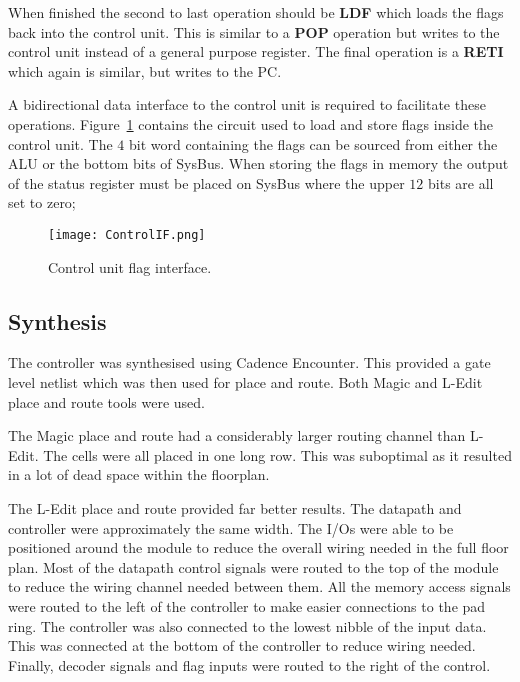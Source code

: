 When finished the second to last operation should be \textbf{LDF} which loads the flags back into the control unit.
This is similar to a \textbf{POP} operation but writes to the control unit instead of a general purpose register. 
The final operation is a \textbf{RETI} which again is similar, but writes to the PC.

A bidirectional data interface to the control unit is required to facilitate these operations. 
Figure~\ref{fig:FlagCircuit} contains the circuit used to load and store flags inside the control unit.
The $4$ bit word containing the flags can be sourced from either the ALU or the bottom bits of SysBus. 
When storing the flags in memory the output of the status register must be placed on SysBus where the upper $12$ bits are all set to zero;  

\begin{figure}[ht]
   \centering
    \texttt{[image: ControlIF.png]}
		\caption{Control unit flag interface.}
		\label{fig:FlagCircuit}
\end{figure}





\subsection{Synthesis}

The controller was synthesised using Cadence Encounter. 
This provided a gate level netlist which was then used for place and route.
Both Magic and L-Edit place and route tools were used. 

The Magic place and route had a considerably larger routing channel than L-Edit.
The cells were all placed in one long row. 
This was suboptimal as it resulted in a lot of dead space within the floorplan.

The L-Edit place and route provided far better results. 
The datapath and controller were approximately the same width. 
The I/Os were able to be positioned around the module to reduce the overall wiring needed in the full floor plan. 
Most of the datapath control signals were routed to the top of the module to reduce the wiring channel needed between them.
All the memory access signals were routed to the left of the controller to make easier connections to the pad ring. 
The controller was also connected to the lowest nibble of the input data. 
This was connected at the bottom of the controller to reduce wiring needed. 
Finally, decoder signals and flag inputs were routed to the right of the control. 



